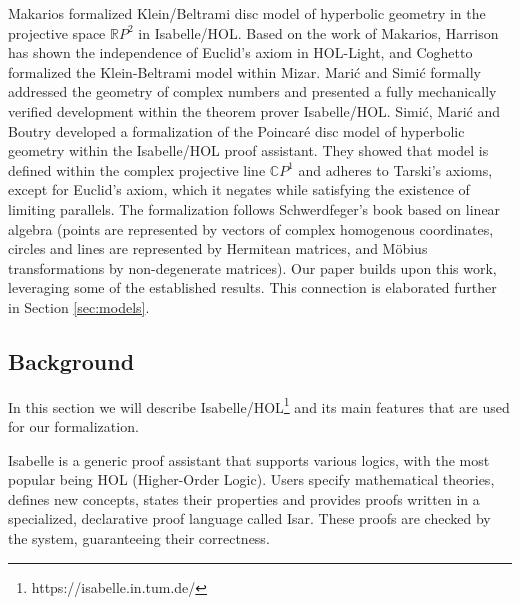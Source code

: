\documentclass[a4paper]{article}
\theoremstyle{definition}
\begin{document}
Makarios formalized Klein/Beltrami disc model of hyperbolic geometry
in the projective space $\mathbb{R}P^2$ in
Isabelle/HOL\cite{makarios}. Based on the work of Makarios, Harrison
has shown the independence of Euclid's axiom in HOL-Light, and
Coghetto formalized the Klein-Beltrami model within
Mizar\cite{harrison2005hol,coghetto2018klein}. Mari\' c and Simi\' c
formally addressed the geometry of complex numbers and presented a
fully mechanically verified development within the theorem prover
Isabelle/HOL\cite{amai-complexplane}. Simi\' c, Mari\' c and Boutry
developed a formalization of the Poincar\'e disc model of hyperbolic
geometry within the Isabelle/HOL proof
assistant\cite{amai-poincare}. They showed that model is defined
within the complex projective line $\mathbb{C}P^1$ and adheres to
Tarski’s axioms, except for Euclid’s axiom, which it negates while
satisfying the existence of limiting parallels. The formalization
follows Schwerdfeger's book\cite{schwerdtfeger} based on linear
algebra (points are represented by vectors of complex homogenous
coordinates, circles and lines are represented by Hermitean matrices,
and M\"obius transformations by non-degenerate matrices). Our paper
builds upon this work, leveraging some of the established
results. This connection is elaborated further in Section
\ref{sec:models}.

\subsection{Background}\label{sec:background}

In this section we will describe
Isabelle/HOL\footnote{https://isabelle.in.tum.de/} and its main
features that are used for our formalization.

Isabelle is a generic proof assistant that supports various logics,
with the most popular being HOL (Higher-Order Logic). Users specify
mathematical theories, defines new concepts, states their properties
and provides proofs written in a specialized, declarative proof
language called Isar\cite{isar}. These proofs are checked by the
system, guaranteeing their correctness.
\end{document}
